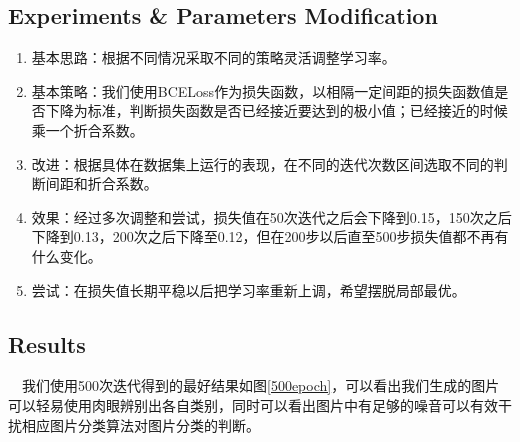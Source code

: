 \documentclass[portrait]{a0poster}
\begin{document}
\begin{multicols}{2}
\begin{CJK}{UTF8}{gbsn}
\subsection*{Experiments \& Parameters Modification}
\begin{enumerate}
	\item 基本思路：根据不同情况采取不同的策略灵活调整学习率。
	\item 基本策略：我们使用BCELoss作为损失函数，以相隔一定间距的损失函数值是否下降为标准，判断损失函数是否已经接近要达到的极小值；已经接近的时候乘一个折合系数。
	\item 改进：根据具体在数据集上运行的表现，在不同的迭代次数区间选取不同的判断间距和折合系数。
	\item 效果：经过多次调整和尝试，损失值在50次迭代之后会下降到0.15，150次之后下降到0.13，200次之后下降至0.12，但在200步以后直至500步损失值都不再有什么变化。
	\item 尝试：在损失值长期平稳以后把学习率重新上调，希望摆脱局部最优。
\end{enumerate}


\end{CJK}
\begin{CJK}{UTF8}{gbsn}
\section*{Results}
\ \ 我们使用500次迭代得到的最好结果如图\ref{500epoch}，可以看出我们生成的图片可以轻易使用肉眼辨别出各自类别，同时可以看出图片中有足够的噪音可以有效干扰相应图片分类算法对图片分类的判断。


\end{CJK}
\end{multicols}
\end{document}
